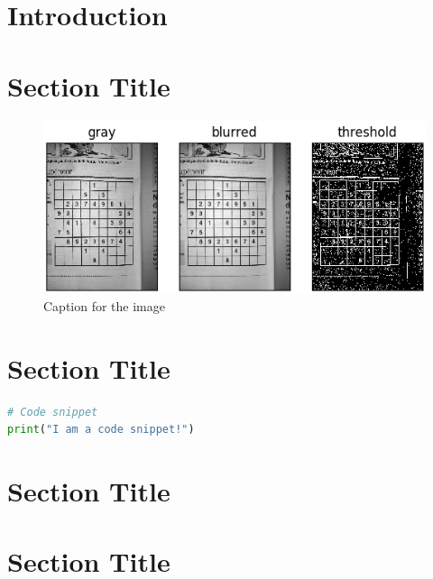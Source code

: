 \section*{Introduction}

\lipsum[1-1]

\section*{Section Title}

\lipsum[1-1]

\begin{figure}[H]
    \centering
    \includegraphics[width=\textwidth]{images/preprocess.png}
    \caption{Caption for the image}
    \setlength{\belowcaptionskip}{-20pt}
    \setlength{\abovecaptionskip}{-20pt}
\end{figure}

\newpage

\section*{Section Title}

\lipsum[1-1]
\cite{watson_2020}

\begin{lstlisting}[language=Python, caption=Caption for the snippet]
# Code snippet
print("I am a code snippet!")
\end{lstlisting}

\lipsum[1-2]

\newpage

\section*{Section Title}

\lipsum[1-3]

\section*{Section Title}
\lipsum[1-2]

